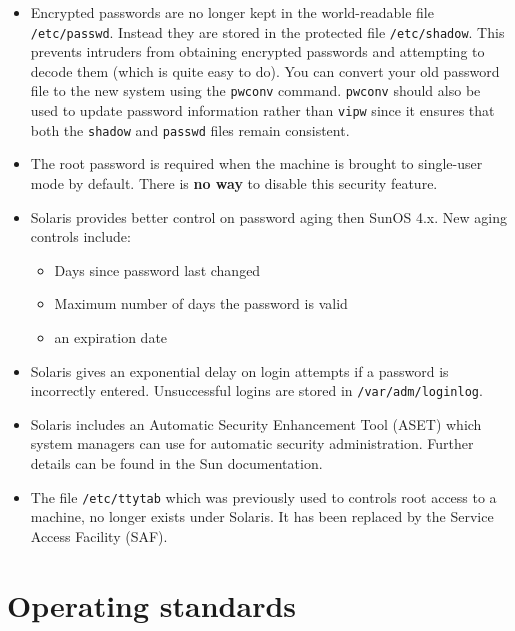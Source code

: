 \begin{itemize}

\item Encrypted passwords are no longer kept in the world-readable
file {\tt /etc/passwd}. Instead they are stored in the protected
file {\tt /etc/shadow}. This prevents intruders from obtaining
encrypted passwords and attempting to decode them (which is quite
easy to do). You can convert your old password file to the new system
using the {\tt pwconv} command. {\tt pwconv} should also
be used to update password information rather than {\tt vipw} since it
ensures that both the {\tt shadow} and {\tt passwd} files remain consistent.

\item The root password is required when the machine is brought to single-user
mode by default. There is {\bf no way} to disable this security feature.

\item Solaris provides better control on password aging then SunOS 4.x.
New aging controls include:

\begin{itemize}

\item Days since password last changed

\item Maximum number of days the password is valid

\item an expiration date

\end{itemize}

\item Solaris gives an exponential delay on login attempts if a password is
incorrectly entered. Unsuccessful logins are stored in {\tt /var/adm/loginlog}.

\item Solaris includes an Automatic Security Enhancement Tool (ASET)
which system managers can use for automatic security administration.
Further details can be found in the Sun documentation.

\item The file {\tt /etc/ttytab} which was previously used to controls
root access to a machine, no longer exists under Solaris. It has been replaced
by the Service Access Facility (SAF).

\end{itemize}


\section{Operating standards}

